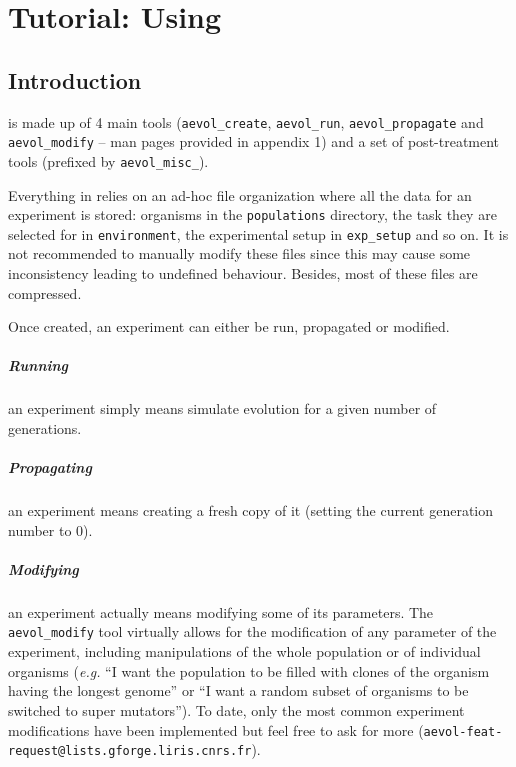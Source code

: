 \chapter{Tutorial: Using \aevol{}}
\label{chap:using-aevol}


\vspace{5mm}

\section{Introduction}

\aevol{} is made up of 4 main tools (\verb?aevol_create?, \verb?aevol_run?, \verb?aevol_propagate? and \verb?aevol_modify? -- man pages provided in appendix 1) and a set of post-treatment tools (prefixed by \verb?aevol_misc_?).

Everything in \aevol{} relies on an ad-hoc file organization where all the data for an experiment is stored: organisms in the \verb?populations? directory, the task they are selected for in \verb?environment?, the experimental setup in \verb?exp_setup? and so on. It is not recommended to manually modify these files since this may cause some inconsistency leading to undefined behaviour. Besides, most of these files are compressed.

Once created, an experiment can either be run, propagated or modified.

\vspace{-7mm}
\paragraph{Running}an experiment simply means simulate evolution for a given number of generations.

\vspace{-7mm}
\paragraph{Propagating}an experiment means creating a fresh copy of it (setting the current generation number to 0).

\vspace{-7mm}
\paragraph{Modifying}an experiment actually means modifying some of its parameters. The \verb?aevol_modify? tool virtually allows for the modification of any parameter of the experiment, including manipulations of the whole population or of individual organisms (\emph{e.g.} ``I want the population to be filled with clones of the organism having the longest genome'' or ``I want a random subset of organisms to be switched to super mutators''). To date, only the most common experiment modifications have been implemented but feel free to ask for more (\verb?aevol-feat-request@lists.gforge.liris.cnrs.fr?).



